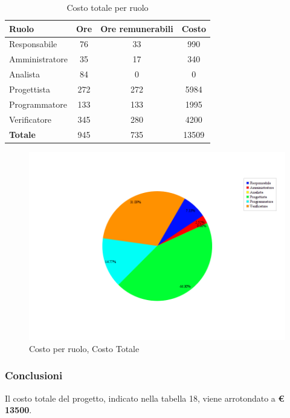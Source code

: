 \begin{table}[H]
	\begin{center}
		\begin{tabular}{|l|c|c|c|}
			\hline
			\textbf{Ruolo}	& \textbf{Ore} &	\textbf{Ore remunerabili}	 &\textbf{Costo} \\
			\hline
			Responsabile	&	76	&	33	&	990	\\
			\hline
			Amministratore	&	35	&	17	&	340	\\
			\hline
			Analista		&	84	&	0	&	0	\\
			\hline
			Progettista		&	272	&	272	&	5984	\\
			\hline
			Programmatore	&	133	&	133	&	1995	\\
			\hline
			Verificatore	&	345	&	280	&	4200	\\
			\hline
			\textbf{Totale}	&	945	&	735	&	13509	\\
			\hline
		\end{tabular}
	\end{center}
	\caption{Costo totale per ruolo}
\end{table}

\begin{figure}[H]
	\centering
	\includegraphics[scale=0.4]{immagini/Grafi/CostoTot}
	\caption{Costo per ruolo, Costo Totale}
\end{figure}

\subsubsection{Conclusioni}
Il costo totale del progetto, indicato nella tabella 18, viene arrotondato a \textbf{€ 13500}.\\
